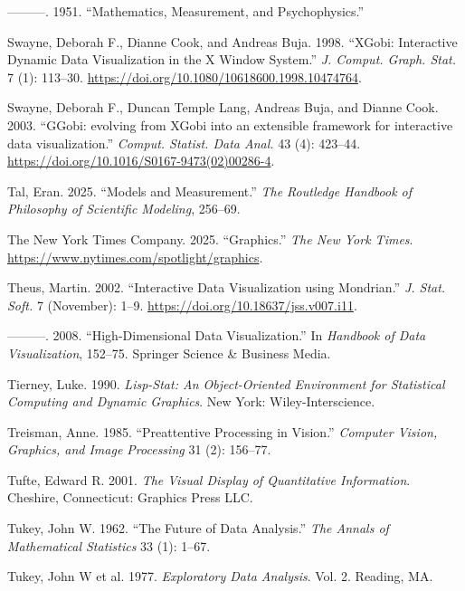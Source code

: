 \documentclass[
]{book}
\newlength{\cslhangindent}
\newenvironment{CSLReferences}[2] %
 {\begin{list}{}{%
  \setlength{\itemindent}{0pt}
  \setlength{\leftmargin}{0pt}
  \setlength{\parsep}{0pt}
  \ifodd #1
   \setlength{\leftmargin}{\cslhangindent}
   \setlength{\itemindent}{-1\cslhangindent}
  \fi
  \setlength{\itemsep}{#2\baselineskip}}}
 {\end{list}}
\begin{document}
\begin{CSLReferences}{1}{0}
---------. 1951. {``Mathematics, Measurement, and Psychophysics.''}

Swayne, Deborah F., Dianne Cook, and Andreas Buja. 1998. {``{XGobi: Interactive Dynamic Data Visualization in the X Window System}.''} \emph{J. Comput. Graph. Stat.} 7 (1): 113--30. \url{https://doi.org/10.1080/10618600.1998.10474764}.

Swayne, Deborah F., Duncan Temple Lang, Andreas Buja, and Dianne Cook. 2003. {``{GGobi: evolving from XGobi into an extensible framework for interactive data visualization}.''} \emph{Comput. Statist. Data Anal.} 43 (4): 423--44. \url{https://doi.org/10.1016/S0167-9473(02)00286-4}.

Tal, Eran. 2025. {``Models and Measurement.''} \emph{The Routledge Handbook of Philosophy of Scientific Modeling}, 256--69.

The New York Times Company. 2025. {``Graphics.''} \emph{The New York Times}. \url{https://www.nytimes.com/spotlight/graphics}.

Theus, Martin. 2002. {``{Interactive Data Visualization using Mondrian}.''} \emph{J. Stat. Soft.} 7 (November): 1--9. \url{https://doi.org/10.18637/jss.v007.i11}.

---------. 2008. {``High-Dimensional Data Visualization.''} In \emph{Handbook of Data Visualization}, 152--75. Springer Science \& Business Media.

Tierney, Luke. 1990. \emph{Lisp-Stat: An Object-Oriented Environment for Statistical Computing and Dynamic Graphics}. New York: Wiley-Interscience.

Treisman, Anne. 1985. {``Preattentive Processing in Vision.''} \emph{Computer Vision, Graphics, and Image Processing} 31 (2): 156--77.

Tufte, Edward R. 2001. \emph{The Visual Display of Quantitative Information}. Cheshire, Connecticut: Graphics Press LLC.

Tukey, John W. 1962. {``The Future of Data Analysis.''} \emph{The Annals of Mathematical Statistics} 33 (1): 1--67.

Tukey, John W et al. 1977. \emph{Exploratory Data Analysis}. Vol. 2. Reading, MA.


\end{CSLReferences}
\end{document}
